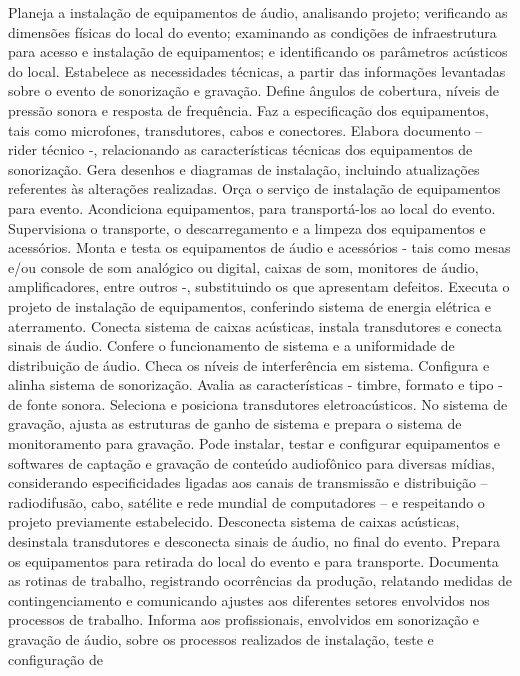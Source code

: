 \documentclass[
]{article}
\begin{document}
Planeja a instalação de equipamentos de áudio, analisando projeto;
verificando as dimensões físicas do local do evento; examinando as
condições de infraestrutura para acesso e instalação de equipamentos; e
identificando os parâmetros acústicos do local. Estabelece as
necessidades técnicas, a partir das informações levantadas sobre o
evento de sonorização e gravação. Define ângulos de cobertura, níveis de
pressão sonora e resposta de frequência. Faz a especificação dos
equipamentos, tais como microfones, transdutores, cabos e conectores.
Elabora documento -- rider técnico -, relacionando as características
técnicas dos equipamentos de sonorização. Gera desenhos e diagramas de
instalação, incluindo atualizações referentes às alterações realizadas.
Orça o serviço de instalação de equipamentos para evento. Acondiciona
equipamentos, para transportá-los ao local do evento. Supervisiona o
transporte, o descarregamento e a limpeza dos equipamentos e acessórios.
Monta e testa os equipamentos de áudio e acessórios - tais como mesas
e/ou console de som analógico ou digital, caixas de som, monitores de
áudio, amplificadores, entre outros -, substituindo os que apresentam
defeitos. Executa o projeto de instalação de equipamentos, conferindo
sistema de energia elétrica e aterramento. Conecta sistema de caixas
acústicas, instala transdutores e conecta sinais de áudio. Confere o
funcionamento de sistema e a uniformidade de distribuição de áudio.
Checa os níveis de interferência em sistema. Configura e alinha sistema
de sonorização. Avalia as características - timbre, formato e tipo - de
fonte sonora. Seleciona e posiciona transdutores eletroacústicos. No
sistema de gravação, ajusta as estruturas de ganho de sistema e prepara
o sistema de monitoramento para gravação. Pode instalar, testar e
configurar equipamentos e softwares de captação e gravação de conteúdo
audiofônico para diversas mídias, considerando especificidades ligadas
aos canais de transmissão e distribuição -- radiodifusão, cabo, satélite
e rede mundial de computadores -- e respeitando o projeto previamente
estabelecido. Desconecta sistema de caixas acústicas, desinstala
transdutores e desconecta sinais de áudio, no final do evento. Prepara
os equipamentos para retirada do local do evento e para transporte.
Documenta as rotinas de trabalho, registrando ocorrências da produção,
relatando medidas de contingenciamento e comunicando ajustes aos
diferentes setores envolvidos nos processos de trabalho. Informa aos
profissionais, envolvidos em sonorização e gravação de áudio, sobre os
processos realizados de instalação, teste e configuração de
\end{document}
